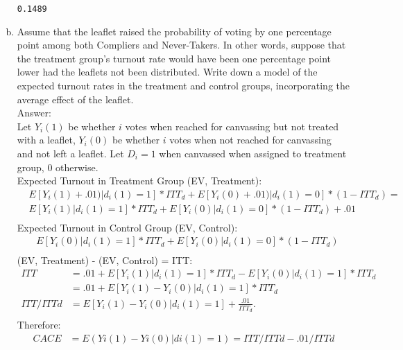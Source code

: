 \documentclass[11pt,notitlepage]{article}\usepackage[]{graphicx}\usepackage[]{color}
\makeatletter
\newenvironment{kframe}{%
 \def\at@end@of@kframe{}%
 \ifinner\ifhmode%
  \def\at@end@of@kframe{\end{minipage}}%
  \begin{minipage}{\columnwidth}%
 \fi\fi%
 \def\FrameCommand##1{\hskip\@totalleftmargin \hskip-\fboxsep
 \colorbox{shadecolor}{##1}\hskip-\fboxsep
     \hskip-\linewidth \hskip-\@totalleftmargin \hskip\columnwidth}%
 \MakeFramed {\advance\hsize-\width
   \@totalleftmargin\z@ \linewidth\hsize
   \@setminipage}}%
 {\par\unskip\endMakeFramed%
 \at@end@of@kframe}
\newenvironment{knitrout}{}{} %
\makeatother
\begin{document}
\begin{enumerate}[a)]
\begin{knitrout}
\begin{kframe}
    \begin{Verbatim}[commandchars=\\\{\}]
  0.1489
    \end{Verbatim}
\end{kframe}
\end{knitrout}
\item Assume that the leaflet raised the probability of voting by one percentage point among both Compliers and Never-Takers. In other words, suppose that the treatment group's turnout rate would have been one percentage point lower had the leaflets not been distributed. Write down a model of the expected turnout rates in the treatment and control groups, incorporating the average effect of the leaflet.\\
Answer:\\
Let $Y_i(1)$ be whether $i$ votes when reached for canvassing but not treated with a leaflet, $Y_i(0)$ be whether $i$ votes when not reached for canvassing and not left a leaflet. Let $D_i = 1$ when canvassed when assigned to treatment group, 0 otherwise.\\
Expected Turnout in Treatment Group (EV, Treatment):
\begin{align*}
& E[Y_i(1) + .01)|d_i(1)=1]*ITT_d + E[Y_i(0)+.01)|d_i(1)=0]*(1-ITT_d) = \\
& E[Y_i(1)|d_i(1)=1]*ITT_d + E[Y_i(0)|d_i(1)=0]*(1-ITT_d) + .01\\
\end{align*}
Expected Turnout in Control Group (EV, Control):
\begin{align*}
& E[Y_i(0)|d_i(1)=1]*ITT_d + E[Y_i(0)|d_i(1)=0]*(1-ITT_d) \\
\end{align*}
(EV, Treatment) - (EV, Control) = ITT:
\begin{align*}
ITT &= .01 + E[Y_i(1)|d_i(1)=1]*ITT_d  - E[Y_i(0)|d_i(1)=1]*ITT_d\\
&= .01 + E[Y_i(1) - Y_i(0)|d_i(1)=1]*ITT_d \\
ITT/ITTd &=  E[Y_i(1) - Y_i(0)|d_i(1)=1] + \frac{.01}{ITT_d}.\\ 
\end{align*}
Therefore:
\begin{align*}
CACE &= E (Yi(1) - Yi(0)|di(1)=1) = ITT/ITTd - .01/ITTd
\end{align*}


\end{enumerate}
\end{document}
